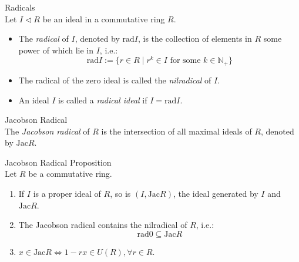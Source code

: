 \begin{definition}{Radicals}\\
Let $I \triangleleft R$ be an ideal in a commutative ring $R$.
\begin{itemize}
    \item The \textit{radical} of $I$, denoted by $\text{rad} I$, is the collection of elements in $R$ some power of which lie in $I$, i.e.:
    \[
    \text{rad} I:= \{r\in R \mid r^k \in I \text{ for some } k\in \mathbb{N}_+ \}
    \]

    \item The radical of the zero ideal is called the \textit{nilradical} of $I$.
    \item An ideal $I$ is called a \textit{radical ideal} if $I= \text{rad} I$.
\end{itemize}
\end{definition}

\begin{definition}{Jacobson Radical}\\
The \textit{Jacobson radical} of $R$ is the intersection of all maximal ideals of $R$, denoted by $\text{Jac} R$.
\end{definition}

\begin{proposition}{Jacobson Radical Proposition}\\
Let $R$ be a commutative ring.
\begin{enumerate}
    \item If $I$ is a proper ideal of $R$, so is $(I,\text{Jac}R)$, the ideal generated by $I$ and $\text{Jac}R$.
    \item The Jacobson radical contains the nilradical of $R$, i.e.:
    $$\text{rad} 0 \subseteq \text{Jac}R$$

    \item $x \in \text{Jac}R \Leftrightarrow 1-rx \in U(R), \forall r\in R$.
\end{enumerate}
\end{proposition}


